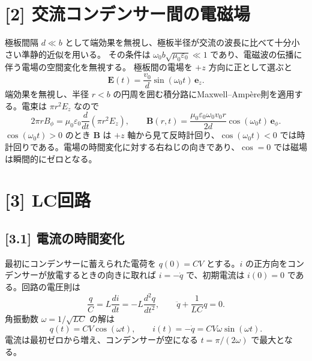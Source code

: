 \documentclass[11pt,a4paper]{article}
\begin{document}
\section*{[2] 交流コンデンサー間の電磁場}
極板間隔 $d\ll b$ として端効果を無視し、極板半径が交流の波長に比べて十分小さい準静的近似を用いる。
その条件は $\omega_0 b\sqrt{\mu_0\varepsilon_0}\ll1$ であり、電磁波の伝播に伴う電場の空間変化を無視する。
極板間の電場を $+z$ 方向に正として選ぶと
\begin{equation}
 \boldsymbol E(t)=\frac{v_0}{d}\sin(\omega_0t)\,\boldsymbol e_z.
\end{equation}
端効果を無視し、半径 $r<b$ の円周を囲む積分路にMaxwell--Amp\`ere則を適用する。電束は $\pi r^2E_z$ なので
\begin{equation}
 2\pi r B_\phi=\mu_0\varepsilon_0\frac{d}{dt}(\pi r^2E_z),
 \qquad
 \boxed{\boldsymbol B(r,t)=\frac{\mu_0\varepsilon_0\omega_0v_0r}{2d}
     \cos(\omega_0t)\,\boldsymbol e_\phi.}
\end{equation}
$\cos(\omega_0t)>0$ のとき $\boldsymbol B$ は $+z$ 軸から見て反時計回り、$\cos(\omega_0t)<0$ では時計回りである。電場の時間変化に対する右ねじの向きであり、$\cos=0$ では磁場は瞬間的にゼロとなる。

\section*{[3] LC回路}
\subsection*{[3.1] 電流の時間変化}
最初にコンデンサーに蓄えられた電荷を $q(0)=CV$ とする。$i$ の正方向をコンデンサーが放電するときの向きに取れば $i=-\dot q$ で、初期電流は $i(0)=0$ である。回路の電圧則は
\begin{equation}
 \frac{q}{C}=L\frac{di}{dt}=-L\frac{d^2q}{dt^2},
 \qquad \ddot q+\frac{1}{LC}q=0.
\end{equation}
角振動数 $\omega=1/\sqrt{LC}$ の解は
\begin{equation}
 \boxed{q(t)=CV\cos(\omega t),\qquad
 i(t)=-\dot q=CV\omega\sin(\omega t).}
\end{equation}
電流は最初ゼロから増え、コンデンサーが空になる $t=\pi/(2\omega)$ で最大となる。
\end{document}
